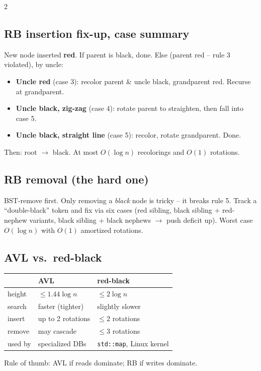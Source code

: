 \documentclass[10pt]{article}
\begin{document}
\begin{multicols}{2}
\subsection*{RB insertion fix-up, case summary}
New node inserted \textbf{red}. If parent is black, done. Else
(parent red -- rule 3 violated), by uncle:
\begin{itemize}
    \item \textbf{Uncle red} (case 3): recolor parent \& uncle black,
    grandparent red. Recurse at grandparent.
    \item \textbf{Uncle black, zig-zag} (case 4): rotate parent to
    straighten, then fall into case 5.
    \item \textbf{Uncle black, straight line} (case 5):
    recolor, rotate grandparent. Done.
\end{itemize}
Then: root $\to$ black. At most $O(\log n)$ recolorings and
$O(1)$ rotations.

\subsection*{RB removal (the hard one)}
BST-remove first. Only removing a \emph{black} node is tricky --
it breaks rule 5. Track a ``double-black'' token and fix via
six cases (red sibling, black sibling + red-nephew variants,
black sibling + black nephews $\to$ push deficit up).
Worst case $O(\log n)$ with $O(1)$ amortized rotations.

\subsection*{AVL vs.\ red-black}
\begin{tabular}{@{}l|l|l@{}}
         & \textbf{AVL}     & \textbf{red-black}\\
\hline
height   & $\le 1.44 \log n$ & $\le 2 \log n$\\
search   & faster (tighter) & slightly slower\\
insert   & up to 2 rotations& $\le 2$ rotations\\
remove   & may cascade      & $\le 3$ rotations\\
used by  & specialized DBs  & \texttt{std::map}, Linux kernel
\end{tabular}
Rule of thumb: AVL if reads dominate; RB if writes dominate.


\end{multicols}
\end{document}
